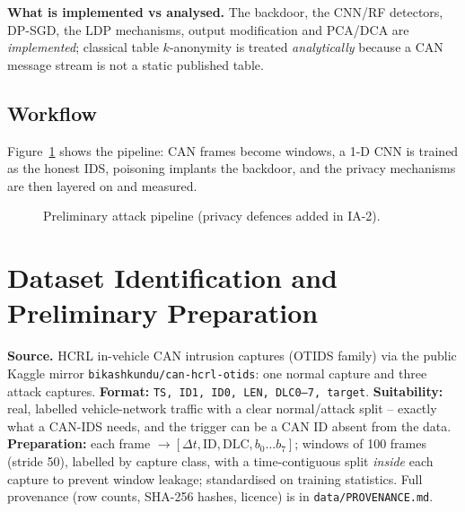 \documentclass[11pt,a4paper]{article}
\begin{document}
\noindent\textbf{What is implemented vs analysed.} The backdoor, the CNN/RF
detectors, DP-SGD, the LDP mechanisms, output modification and PCA/DCA are
\emph{implemented}; classical table $k$-anonymity is treated \emph{analytically}
because a CAN message stream is not a static published table.

\subsection{Workflow}
Figure~\ref{fig:flow} shows the pipeline: CAN frames become windows, a 1-D CNN is
trained as the honest IDS, poisoning implants the backdoor, and the privacy
mechanisms are then layered on and measured.
\begin{figure}[htbp]\centering
{}
\caption{Preliminary attack pipeline (privacy defences added in IA-2).}\label{fig:flow}
\end{figure}

\section{Dataset Identification and Preliminary Preparation}\label{sec:data}
\textbf{Source.} HCRL in-vehicle CAN intrusion captures (OTIDS family) via the
public Kaggle mirror \texttt{bikashkundu/can-hcrl-otids}: one normal capture and
three attack captures. \textbf{Format:} \texttt{TS, ID1, ID0, LEN, DLC0--7,
target}. \textbf{Suitability:} real, labelled vehicle-network traffic with a clear
normal/attack split -- exactly what a CAN-IDS needs, and the trigger can be a CAN
ID absent from the data. \textbf{Preparation:} each frame
$\to[\Delta t,\text{ID},\text{DLC},b_0\ldots b_7]$; windows of 100 frames (stride
50), labelled by capture class, with a time-contiguous split \emph{inside} each
capture to prevent window leakage; standardised on training statistics. Full
provenance (row counts, SHA-256 hashes, licence) is in \texttt{data/PROVENANCE.md}.
\end{document}
